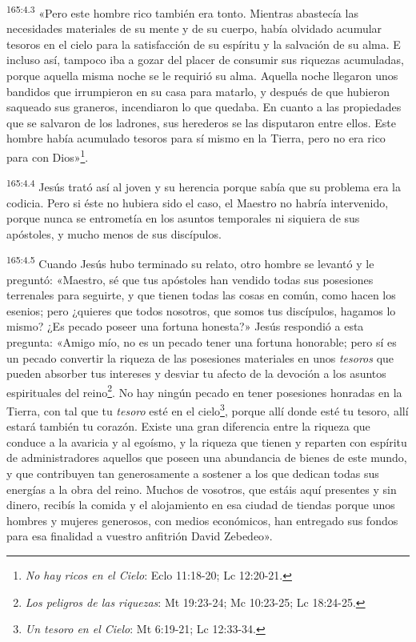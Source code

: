 \par
\textsuperscript{165:4.3} «Pero este hombre rico también era tonto. Mientras abastecía las necesidades materiales de su mente y de su cuerpo, había olvidado acumular tesoros en el cielo para la satisfacción de su espíritu y la salvación de su alma. E incluso así, tampoco iba a gozar del placer de consumir sus riquezas acumuladas, porque aquella misma noche se le requirió su alma. Aquella noche llegaron unos bandidos que irrumpieron en su casa para matarlo, y después de que hubieron saqueado sus graneros, incendiaron lo que quedaba. En cuanto a las propiedades que se salvaron de los ladrones, sus herederos se las disputaron entre ellos. Este hombre había acumulado tesoros para sí mismo en la Tierra, pero no era rico para con Dios»\footnote{\textit{No hay ricos en el Cielo}: Eclo 11:18-20; Lc 12:20-21.}.

\par
\textsuperscript{165:4.4} Jesús trató así al joven y su herencia porque sabía que su problema era la codicia. Pero si éste no hubiera sido el caso, el Maestro no habría intervenido, porque nunca se entrometía en los asuntos temporales ni siquiera de sus apóstoles, y mucho menos de sus discípulos.

\par
\textsuperscript{165:4.5} Cuando Jesús hubo terminado su relato, otro hombre se levantó y le preguntó: «Maestro, sé que tus apóstoles han vendido todas sus posesiones terrenales para seguirte, y que tienen todas las cosas en común, como hacen los esenios; pero ¿quieres que todos nosotros, que somos tus discípulos, hagamos lo mismo? ¿Es pecado poseer una fortuna honesta?» Jesús respondió a esta pregunta: «Amigo mío, no es un pecado tener una fortuna honorable; pero sí es un pecado convertir la riqueza de las posesiones materiales en unos \textit{tesoros} que pueden absorber tus intereses y desviar tu afecto de la devoción a los asuntos espirituales del reino\footnote{\textit{Los peligros de las riquezas}: Mt 19:23-24; Mc 10:23-25; Lc 18:24-25.}. No hay ningún pecado en tener posesiones honradas en la Tierra, con tal que tu \textit{tesoro} esté en el cielo\footnote{\textit{Un tesoro en el Cielo}: Mt 6:19-21; Lc 12:33-34.}, porque allí donde esté tu tesoro, allí estará también tu corazón. Existe una gran diferencia entre la riqueza que conduce a la avaricia y al egoísmo, y la riqueza que tienen y reparten con espíritu de administradores aquellos que poseen una abundancia de bienes de este mundo, y que contribuyen tan generosamente a sostener a los que dedican todas sus energías a la obra del reino. Muchos de vosotros, que estáis aquí presentes y sin dinero, recibís la comida y el alojamiento en esa ciudad de tiendas porque unos hombres y mujeres generosos, con medios económicos, han entregado sus fondos para esa finalidad a vuestro anfitrión David Zebedeo».

